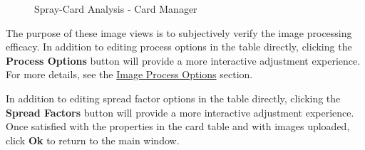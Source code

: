 \documentclass[10pt,letterpaper,titlepage]{article}
\begin{document}
    \begin{figure}[hb]
        \centering
        \caption{Spray-Card Analysis - Card Manager}
        \label{fig:card_manager_image}
    \end{figure}
    The purpose of these image views is to subjectively verify the image processing efficacy. In addition to editing process options in the table directly, clicking the \textbf{Process Options} button will provide a more interactive adjustment experience. For more details, see the \hyperref[sec:image_process]{Image Process Options} section.\par
    In addition to editing spread factor options in the table directly, clicking the \textbf{Spread Factors} button will provide a more interactive adjustment experience.
    Once satisfied with the properties in the card table and with images uploaded, click \textbf{Ok} to return to the main window.
    \FloatBarrier
    \newpage
\end{document}
